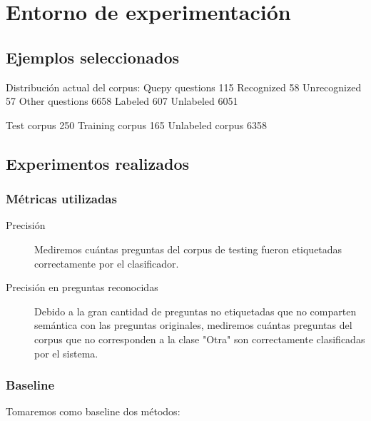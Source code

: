 \section{Entorno de experimentación}

\subsection{Ejemplos seleccionados}

Distribución actual del corpus:
Quepy questions 115
	Recognized 58
	Unrecognized 57
Other questions 6658
	Labeled 607
	Unlabeled 6051

Test corpus 250
Training corpus 165
Unlabeled corpus 6358

\subsection{Experimentos realizados}


\subsubsection{Métricas utilizadas}
\begin{description}
    \item[Precisión] Mediremos cuántas preguntas del corpus de testing fueron etiquetadas correctamente por el clasificador.
    \item[Precisión en preguntas reconocidas] Debido a la gran cantidad de preguntas no etiquetadas que no comparten semántica con las preguntas originales, mediremos cuántas preguntas del corpus que no corresponden a la clase "Otra" son correctamente clasificadas por el sistema.
\end{description}

\subsubsection{Baseline}
Tomaremos como baseline dos métodos:
\begin{description}
    \item[]
\end{description}

